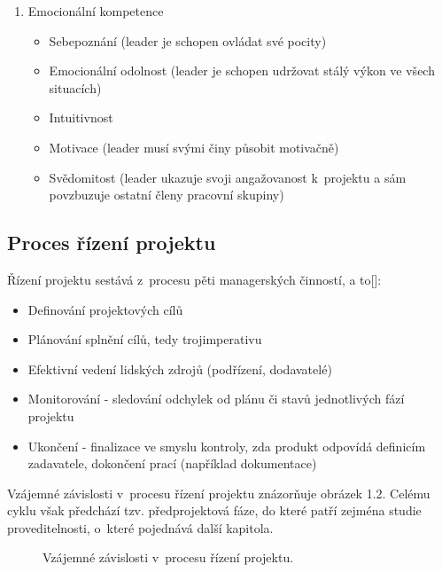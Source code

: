 \documentclass[
	11pt, oneside, printed, draft, 
	table,   %
	lof,     %
	lot     %
]{fithesis3}
\newcommand{\citepages}[2]{[\cite[#1]{#2}]}
\newcommand{\mezera}{\bigskip}
\begin{document}
{\begin{enumerate}
\begin{itemize}
\item Kritické myšlení (sběr relevantních informací z~různých zdrojů a hledání výhodných a nevýhodných řešení)
\item Vize a představivost (leader má jasnou vizi o~budoucnosti projektu)
\item Strategická perspektiva (leader si je vědom problémů a jejich důsledků, nachází příležitosti a hrozby)
\end{itemize}
\item Emocionální kompetence
\begin{itemize}
\item Sebepoznání (leader je schopen ovládat své pocity)
\item Emocionální odolnost (leader je schopen udržovat stálý výkon ve všech situacích)
\item Intuitivnost
\item Motivace (leader musí svými činy působit motivačně)
\item Svědomitost (leader ukazuje svoji angažovanost k~projektu a sám povzbuzuje ostatní členy pracovní skupiny)
\end{itemize}
\end{enumerate}

\subsection{Proces řízení projektu}
Řízení projektu sestává z~procesu pěti managerských činností, a to\citepages{22-23}{rehacek_2013}:
\mezera
\begin{itemize}
\item Definování projektových cílů
\item Plánování splnění cílů, tedy trojimperativu
\item Efektivní vedení lidských zdrojů (podřízení, dodavatelé)
\item Monitorování - sledování odchylek od plánu či stavů jednotlivých fází projektu
\item Ukončení - finalizace ve smyslu kontroly, zda produkt odpovídá definicím zadavatele, dokončení prací (například dokumentace)
\end{itemize}

Vzájemné závislosti v~procesu řízení projektu znázorňuje obrázek 1.2. %
Celému cyklu však předchází tzv. předprojektová fáze, do které patří zejména studie proveditelnosti, o~které pojednává další kapitola.

\begin{figure}[H]
\centering
\caption{Vzájemné závislosti v~procesu řízení projektu.}
\end{figure}

}
\end{document}
